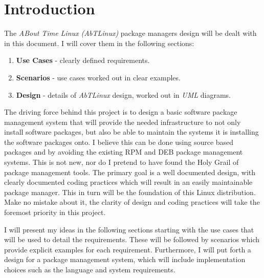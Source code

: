 \section{Introduction}  
The \emph{ABout Time Linux (AbTLinux)} package managers design will be dealt with in
this document. I will cover them in the following sections:
 
\begin{enumerate}
	\item \textbf{Use Cases} - clearly defined requirements.
	\item \textbf{Scenarios} - use cases worked out in clear examples.
	\item \textbf{Design} - details of \emph{AbTLinux} design, worked out in
		\emph{UML} diagrams.
\end{enumerate}

The driving force behind this project is to design a basic software
package management system that will provide the needed infrastructure to not
only install software packages, but also be able to maintain the systems it is
installing the software packages onto. I believe this can be done using
source based packages and by avoiding the existing RPM and DEB package
management systems. This is not new, nor do I pretend to have found the Holy
Grail of package management tools. The primary goal is a well documented design, with
clearly documented coding practices which will result in an easily
maintainable package manager. This in turn will be the foundation of this Linux
distribution. Make no mistake about it, the clarity of design and coding
practices will take the foremost priority in this project.

I will present my ideas in the following sections starting with the use cases
that will be used to detail the requirements. These will be followed by
scenarios which provide explicit examples for each requirement. Furthermore, I
will put forth a design for a package management system, which will include
implementation choices such as the language and system requirements.